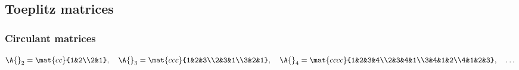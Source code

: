 \subsection{Toeplitz matrices}

\subsubsection{Circulant matrices}
\begin{equation}
  \A{}_{2} =
    \mat{cc}{1&2\\2&1}, \quad
  \A{}_{3} =
    \mat{ccc}{1&2&3\\2&3&1\\3&2&1}, \quad
  \A{}_{4} =
    \mat{cccc}{1&2&3&4\\2&3&4&1\\3&4&1&2\\4&1&2&3}, \quad \dots
\end{equation}

